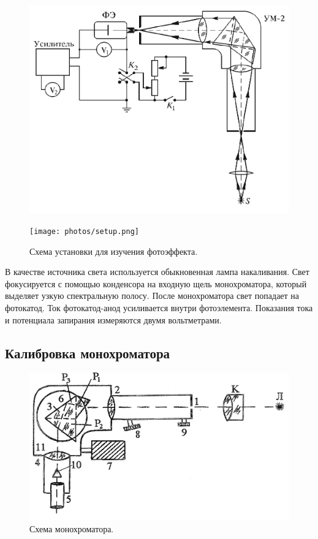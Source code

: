 \documentclass[a4paper, 12pt]{article} %
\begin{document}
	\begin{figure}[h!]
		\centering
		\begin{minipage}{0.4\textwidth}
			\centering
			\includegraphics[width=0.9\linewidth]{res/scheme.png}
		\end{minipage}%
		\begin{minipage}{0.6\textwidth}
			\centering
			\texttt{[image: photos/setup.png]}
		\end{minipage}
		\caption{Схема установки для изучения фотоэффекта.}
		\label{fig:setup}
	\end{figure}
	
	В качестве источника света используется обыкновенная лампа накаливания. Свет фокусируется с помощью конденсора на входную щель монохроматора, который выделяет узкую спектральную полосу. После монохроматора свет попадает на фотокатод. Ток фотокатод-анод усиливается внутри фотоэлемента. Показания тока и потенциала запирания измеряются двумя вольтметрами.
	
	\subsection{Калибровка монохроматора}
	\begin{figure}
		\includegraphics[width=\linewidth]{res/um2.png}
		\caption{Схема монохроматора.}
		\label{fig:monochromator}
		\vspace{-10pt}
	\end{figure}
\end{document}
